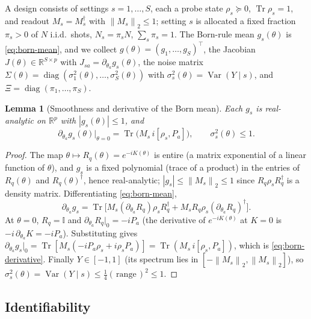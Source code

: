 \documentclass[aps,prresearch,reprint,superscriptaddress,nofootinbib,amsmath,amssymb]{revtex4-2}
\newcommand{\norm}[1]{\left\lVert #1 \right\rVert}
\newcommand{\abs}[1]{\left\lvert #1 \right\rvert}
\newcommand{\Tr}{\operatorname{Tr}}
\newcommand{\id}{\mathbb{I}}
\newtheorem{lemma}{Lemma}
\begin{document}
A design consists of settings $s=1,\dots,S$, each a probe state $\rho_s\succeq0$, $\Tr\rho_s=1$, and readout $M_s=M_s^\dagger$ with $\norm{M_s}_2\leq1$; setting $s$ is allocated a fixed fraction $\pi_s>0$ of $N$ i.i.d.\ shots, $N_s=\pi_sN$, $\sum_s\pi_s=1$. The Born-rule mean $g_s(\theta)$ is \eqref{eq:born-mean}, and we collect $g(\theta)=(g_1,\dots,g_S)^\top$, the Jacobian $J(\theta)\in\mathbb{R}^{S\times p}$ with $J_{sa}=\partial_{\theta_a}g_s(\theta)$, the noise matrix $\Sigma(\theta)=\operatorname{diag}(\sigma_1^2(\theta),\dots,\sigma_S^2(\theta))$ with $\sigma_s^2(\theta)=\operatorname{Var}(Y\mid s)$, and $\Xi=\operatorname{diag}(\pi_1,\dots,\pi_S)$.

\begin{lemma}[Smoothness and derivative of the Born mean]
\label{lem:born-smooth}
Each $g_s$ is real-analytic on $\mathbb{R}^p$ with $\abs{g_s(\theta)}\leq1$, and
\begin{equation}
    \partial_{\theta_a}g_s(\theta)\big|_{\theta=0}=\Tr\!\bigl(M_s\,i[\rho_s,P_a]\bigr),
    \qquad
    \sigma_s^2(\theta)\leq1 .
    \label{eq:born-derivative}
\end{equation}
\end{lemma}

\begin{proof}
The map $\theta\mapsto R_q(\theta)=e^{-iK(\theta)}$ is entire (a matrix exponential of a linear function of $\theta$), and $g_s$ is a fixed polynomial (trace of a product) in the entries of $R_q(\theta)$ and $R_q(\theta)^\dagger$, hence real-analytic; $\abs{g_s}\leq\norm{M_s}_2\leq1$ since $R_q\rho_sR_q^\dagger$ is a density matrix. Differentiating \eqref{eq:born-mean},
\begin{equation*}
    \partial_{\theta_a}g_s=\Tr\!\bigl[M_s(\partial_{\theta_a}R_q)\rho_sR_q^\dagger+M_sR_q\rho_s(\partial_{\theta_a}R_q)^\dagger\bigr].
\end{equation*}
At $\theta=0$, $R_q=\id$ and $\partial_{\theta_a}R_q\big|_0=-iP_a$ (the derivative of $e^{-iK(\theta)}$ at $K=0$ is $-i\,\partial_{\theta_a}K=-iP_a$). Substituting gives $\partial_{\theta_a}g_s\big|_0=\Tr[M_s(-iP_a\rho_s+i\rho_sP_a)]=\Tr(M_s\,i[\rho_s,P_a])$, which is \eqref{eq:born-derivative}. Finally $Y\in[-1,1]$ (its spectrum lies in $[-\norm{M_s}_2,\norm{M_s}_2]$), so $\sigma_s^2(\theta)=\operatorname{Var}(Y\mid s)\leq\tfrac14(\,\mathrm{range}\,)^2\leq1$.
\end{proof}

\subsection{Identifiability}
\label{app:inference-ident}
\end{document}
